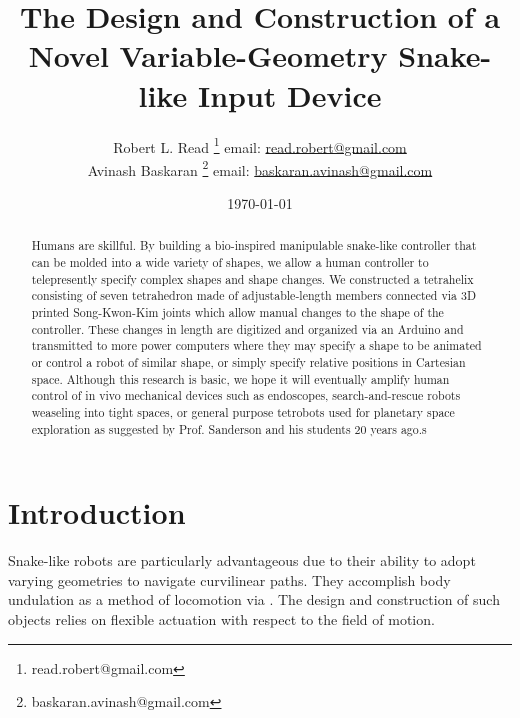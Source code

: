 \documentclass[11pt]{article}
\title{The Design and Construction of a Novel Variable-Geometry Snake-like Input Device}
\author{Robert L. Read
  \thanks{read.robert@gmail.com}
  email: \href{mailto:read.robert@gmail.com}{read.robert@gmail.com}\\
Avinash Baskaran
  \thanks{baskaran.avinash@gmail.com}
  email: \href{mailto:Baskaran.avinash@gmail.com}{baskaran.avinash@gmail.com}
  }
\affil{Public Invention, an educational non-profit.}
\date{\today}
\begin{document}
\maketitle



\nocite{read2018transforming,readtetrahelix}

\nocite{sanderson1996modular}

\nocite{lee1999dynamics}

\nocite{lee2002dynamic}

\nocite{NTRT}

\nocite{TetrobotBook}

\nocite{claypool2012readily}

\nocite{mirletz2014}

\nocite{paul2006}




\begin{abstract}

	Humans are skillful. By building a bio-inspired manipulable snake-like controller that can be molded into a wide variety of shapes, we allow a human controller to telepresently specify complex shapes and shape changes. We constructed a tetrahelix consisting of seven tetrahedron made of adjustable-length members connected via 3D printed Song-Kwon-Kim joints which allow manual changes to the shape of the controller. These changes in length are digitized and organized via an Arduino and transmitted to more power computers where they may specify a shape to be animated or control a robot of similar shape, or simply specify relative positions in Cartesian space. Although this research is basic, we hope it will eventually amplify human control of in vivo mechanical devices such as endoscopes, search-and-rescue robots weaseling into tight spaces, or general purpose tetrobots used for planetary space exploration as suggested by Prof. Sanderson and his students 20 years ago.s

\end{abstract}


\section{Introduction}

Snake-like robots are particularly advantageous due to their ability to adopt varying geometries to navigate curvilinear paths.  They accomplish body undulation as a method of locomotion via . The design and construction of such objects relies on flexible actuation with respect to the field of motion.
\end{document}
